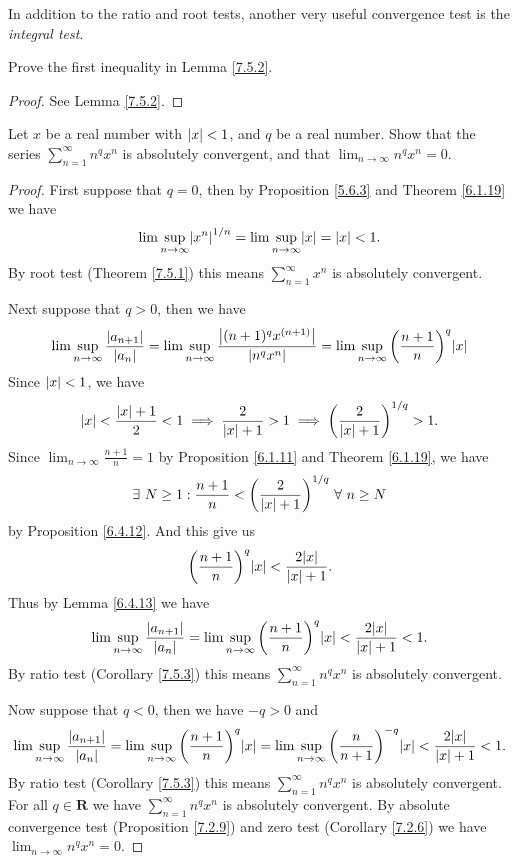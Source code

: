 \begin{remark}\label{7.5.5}
In addition to the ratio and root tests, another very useful convergence test is the \emph{integral test}.
\end{remark}

\exercisesection

\begin{exercise}\label{ex 7.5.1}
Prove the first inequality in Lemma \ref{7.5.2}.
\end{exercise}

\begin{proof}
See Lemma \ref{7.5.2}.
\end{proof}

\begin{exercise}\label{ex 7.5.2}
Let \(x\) be a real number with \(\abs*{x} < 1\), and \(q\) be a real number.
Show that the series \(\sum_{n = 1}^\infty n^q x^n\) is absolutely convergent, and that \(\lim_{n \to \infty} n^q x^n = 0\).
\end{exercise}

\begin{proof}
First suppose that \(q = 0\), then by Proposition \ref{5.6.3} and Theorem \ref{6.1.19} we have
\[
    \lim\sup_{n \to \infty} \abs*{x^n}^{1 / n} = \lim\sup_{n \to \infty} \abs*{x} = \abs*{x} < 1.
\]
By root test (Theorem \ref{7.5.1}) this means \(\sum_{n = 1}^\infty x^n\) is absolutely convergent.

Next suppose that \(q > 0\), then we have
\[
    \lim\sup_{n \to \infty} \frac{\abs*{a_{n + 1}}}{\abs*{a_n}} = \lim\sup_{n \to \infty} \frac{\abs*{(n + 1)^q x^{(n + 1)}}}{\abs*{n^q x^n}} = \lim\sup_{n \to \infty} \bigg(\frac{n + 1}{n}\bigg)^q \abs*{x}
\]
Since \(\abs*{x} < 1\), we have
\[
    \abs*{x} < \frac{\abs*{x} + 1}{2} < 1 \implies \frac{2}{\abs*{x} + 1} > 1 \implies \bigg(\frac{2}{\abs*{x} + 1}\bigg)^{1 / q} > 1.
\]
Since \(\lim_{n \to \infty} \frac{n + 1}{n} = 1\) by Proposition \ref{6.1.11} and Theorem \ref{6.1.19}, we have
\[
    \exists\ N \geq 1 : \frac{n + 1}{n} < \bigg(\frac{2}{\abs*{x} + 1}\bigg)^{1 / q} \ \forall\ n \geq N
\]
by Proposition \ref{6.4.12}.
And this give us
\[
    \bigg(\frac{n + 1}{n}\bigg)^q \abs*{x} < \frac{2\abs*{x}}{\abs*{x} + 1}.
\]
Thus by Lemma \ref{6.4.13} we have
\[
    \lim\sup_{n \to \infty} \frac{\abs*{a_{n + 1}}}{\abs*{a_n}} = \lim\sup_{n \to \infty} \bigg(\frac{n + 1}{n}\bigg)^q \abs*{x} < \frac{2\abs*{x}}{\abs*{x} + 1} < 1.
\]
By ratio test (Corollary \ref{7.5.3}) this means \(\sum_{n = 1}^\infty n^q x^n\) is absolutely convergent.

Now suppose that \(q < 0\), then we have \(-q > 0\) and
\[
    \lim\sup_{n \to \infty} \frac{\abs*{a_{n + 1}}}{\abs*{a_n}} = \lim\sup_{n \to \infty} \bigg(\frac{n + 1}{n}\bigg)^q \abs*{x} = \lim\sup_{n \to \infty} \bigg(\frac{n}{n + 1}\bigg)^{-q} \abs*{x} < \frac{2\abs*{x}}{\abs*{x} + 1} < 1.
\]
By ratio test (Corollary \ref{7.5.3}) this means \(\sum_{n = 1}^\infty n^q x^n\) is absolutely convergent.
For all \(q \in \mathbf{R}\) we have \(\sum_{n = 1}^\infty n^q x^n\) is absolutely convergent.
By absolute convergence test (Proposition \ref{7.2.9}) and zero test (Corollary \ref{7.2.6}) we have \(\lim_{n \to \infty} n^q x^n = 0\).
\end{proof}

